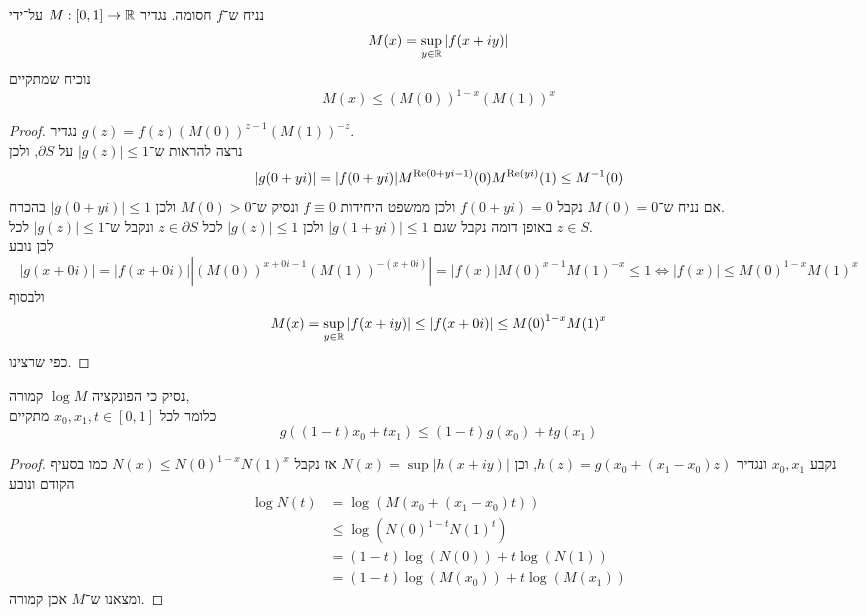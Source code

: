 \subquestion{}
נניח ש־$f$ חסומה.
נגדיר $M : [0, 1] \to \mathbb{R}$ על־ידי
\[
	M(x) = \sup_{y \in \mathbb{R}} |f(x + iy)|
\]
נוכיח שמתקיים
\[
	M(x) \le {(M(0))}^{1 - x} {(M(1))}^x
\]
\begin{proof}
	נגדיר $g(z) = f(z) {(M(0))}^{z - 1} {(M(1))}^{-z}$. \\
	נרצה להראות ש־$|g(z)| \le 1$ על $\partial S$, ולכן
	\[
		|g(0 + yi)|
		= |f(0 + yi)| M^{\operatorname{Re}(0 + yi - 1)}(0) M^{\operatorname{Re}(yi)}(1)
		\le M^{-1}(0)
	\]
	אם נניח ש־$M(0) = 0$ נקבל $f(0 + yi) = 0$ ולכן ממשפט היחידות $f \equiv 0$ ונסיק ש־$M(0) > 0$ ולכן $|g(0 + yi)| \le 1$ בהכרח. \\
	באופן דומה נקבל שגם $|g(1 + yi)| \le 1$ ולכן $|g(z)| \le 1$ לכל $z \in \partial S$ ונקבל ש־$|g(z)| \le 1$ לכל $z \in S$. \\
	לכן נובע
	\[
		|g(x + 0i)|
		= |f(x + 0i)| |{(M(0))}^{x + 0i - 1} {(M(1))}^{-(x + 0i)}|
		= |f(x)| {M(0)}^{x - 1} {M(1)}^{-x}
		\le 1
		\iff
		|f(x)|
		\le {M(0)}^{1 - x} {M(1)}^x
	\]
	ולבסוף
	\[
		M(x)
		= \sup_{y \in \mathbb{R}} |f(x + iy)|
		\le |f(x + 0i)|
		\le {M(0)}^{1 - x} {M(1)}^x
	\]
	כפי שרצינו.
\end{proof}

\subquestion{}
נסיק כי הפונקציה $\log M$ קמורה, \\
כלומר לכל $x_0, x_1, t \in [0, 1]$ מתקיים
\[
	g((1 - t)x_0 + tx_1) \le (1 - t) g(x_0) + t g(x_1)
\]
\begin{proof}
	נקבע $x_0, x_1$ ונגדיר $h(z) = g(x_0 + (x_1 - x_0)z)$, וכן $N(x) = \sup |h(x + iy)|$ אז נקבל $N(x) \le {N(0)}^{1 - x} {N(1)}^x$ כמו בסעיף הקודם ונובע
	\begin{align*}
		\log N(t)
		& = \log(M(x_0 + (x_1 - x_0)t)) \\
		& \le \log({N(0)}^{1 - t} {N(1)}^t) \\
		& = (1 - t) \log(N(0)) + t \log(N(1)) \\
		& = (1 - t) \log(M(x_0)) + t \log(M(x_1))
	\end{align*}
	ומצאנו ש־$M$ אכן קמורה.
\end{proof}

